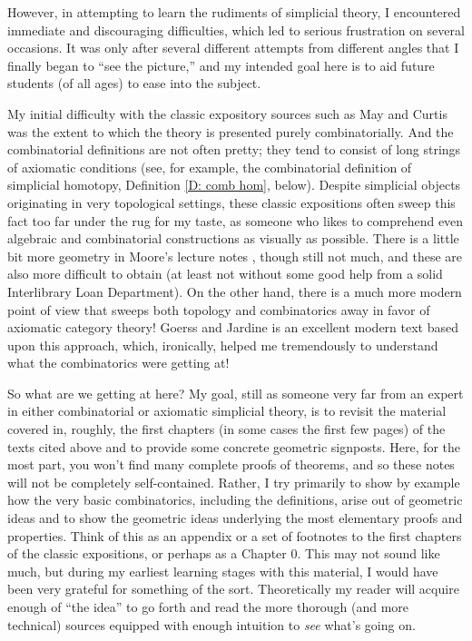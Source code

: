 \documentclass[12pt]{article}
\theoremstyle{plain}
\theoremstyle{definition}
\theoremstyle{remark}
\begin{document}
 However, in attempting to learn the rudiments of simplicial  theory, I encountered immediate and discouraging difficulties, which led to serious frustration on several occasions. It was only after several different attempts from different angles that I finally began to ``see the picture,'' and my intended goal here is to aid future students (of all ages) to ease into the subject.

My initial difficulty with the classic expository sources such as May \cite{MAY67} and Curtis \cite{Cu71} was the extent to which the theory is presented purely combinatorially. And the combinatorial definitions are not often pretty; they tend to consist of long strings of axiomatic conditions (see, for example, the combinatorial definition of simplicial homotopy,   Definition \ref{D: comb hom}, below). Despite simplicial objects originating in very topological settings, these classic expositions often sweep this fact too far under the rug for my taste, as someone who likes to comprehend even algebraic and combinatorial constructions as visually as possible. There is a little bit more geometry in Moore's lecture notes \cite{MOORE}, though still not much, and these are also more difficult to obtain (at least not without some good help from a solid Interlibrary Loan Department). On the other hand, there is a much more modern point of view that sweeps both topology and combinatorics away in favor of axiomatic category theory! Goerss and Jardine \cite{GoeJar} is an excellent modern text based upon this approach, which, ironically, helped me tremendously to understand what the combinatorics were getting at!

So what are we getting at here? My goal, still as someone very far from an expert in either combinatorial or axiomatic simplicial theory, is to revisit the material covered in, roughly, the first chapters (in some cases the first few pages) of the texts cited above and to provide some concrete geometric signposts. Here, for the most part, you won't find many complete proofs of theorems, and so these notes will not be completely self-contained. Rather, I try primarily to show by example how the very basic combinatorics, including the definitions, arise out of geometric ideas and to show the geometric ideas underlying the most elementary proofs and properties. Think of this as an appendix or a set of footnotes  to the first chapters of the classic expositions, or perhaps as a Chapter 0. This may not sound like much, but during my earliest learning stages with this material, I would have been very grateful for something of the sort. Theoretically my reader will acquire  enough of ``the idea'' to go forth and read the more thorough (and more technical) sources equipped with enough intuition to \emph{see} what's going on. 
\end{document}

